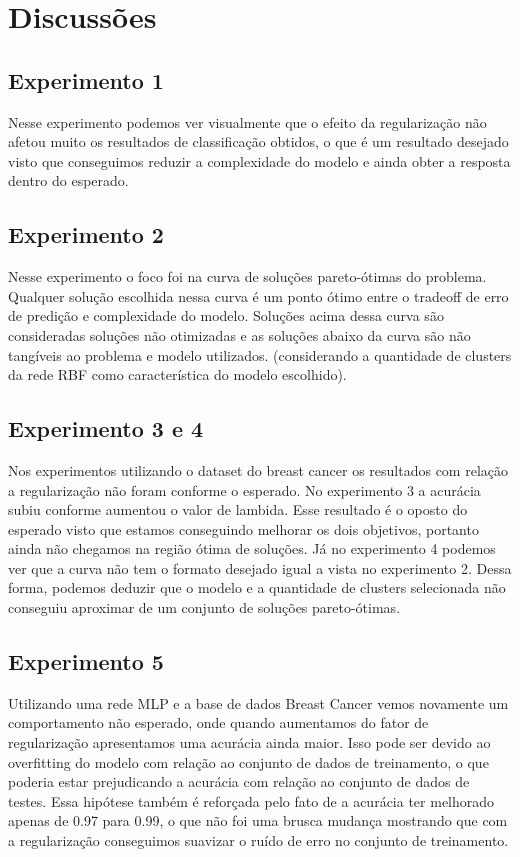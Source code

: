 \section{Discussões}

\subsection*{Experimento 1}

Nesse experimento podemos ver visualmente que o efeito da regularização não afetou muito os resultados de classificação obtidos, o que é um resultado desejado
visto que conseguimos reduzir a complexidade do modelo e ainda obter a resposta dentro do esperado.

\subsection*{Experimento 2}

Nesse experimento o foco foi na curva de soluções pareto-ótimas do problema. Qualquer solução escolhida nessa curva é um ponto ótimo entre o tradeoff de erro de predição e complexidade do modelo.
Soluções acima dessa curva são consideradas soluções não otimizadas e as soluções abaixo da curva são não tangíveis ao problema e modelo utilizados. (considerando a quantidade de clusters da rede RBF como característica do modelo escolhido).

\subsection*{Experimento 3 e 4}

Nos experimentos utilizando o dataset do breast cancer os resultados com relação a regularização não foram conforme o esperado. No experimento 3 a acurácia subiu conforme aumentou o valor de lambida. Esse resultado é o oposto do esperado visto que estamos conseguindo melhorar os dois objetivos, portanto ainda não
chegamos na região ótima de soluções. Já no experimento 4 podemos ver que a curva não tem o formato desejado igual a vista no experimento 2. Dessa forma, podemos deduzir que o modelo e a quantidade de clusters selecionada não conseguiu aproximar de um conjunto de soluções pareto-ótimas.

\subsection*{Experimento 5}

Utilizando uma rede MLP e a base de dados Breast Cancer vemos novamente um comportamento não esperado, onde quando aumentamos do fator de regularização apresentamos uma acurácia ainda maior.
Isso pode ser devido ao overfitting do modelo com relação ao conjunto de dados de treinamento, o que poderia estar prejudicando a acurácia com relação ao conjunto de dados de testes.
Essa hipótese também é reforçada pelo fato de a acurácia ter melhorado apenas de 0.97 para 0.99, o que não foi uma brusca mudança mostrando que com a regularização conseguimos suavizar o ruído de erro no conjunto de treinamento.

